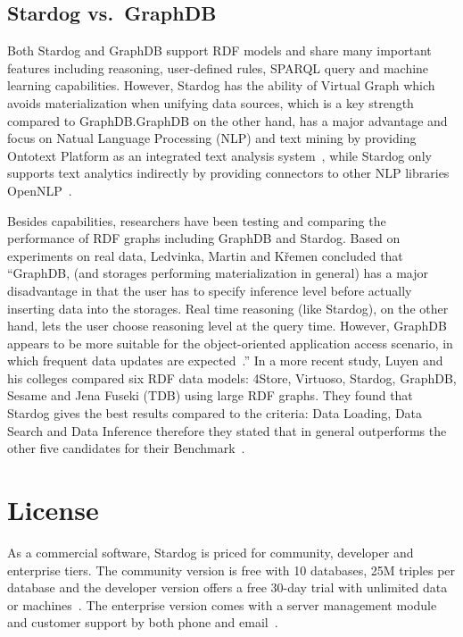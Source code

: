 \subsection{Stardog vs.\ GraphDB}
Both Stardog and GraphDB support RDF models and share many important 
features including reasoning, user-defined rules, SPARQL query and machine 
learning capabilities. However, Stardog has the ability of Virtual Graph which 
avoids materialization when unifying data sources, which is a key strength 
compared to GraphDB.\@ GraphDB on the other hand, has a major advantage 
and focus on Natual Language Processing (NLP) and text mining by 
providing Ontotext Platform as an integrated text analysis 
system~\cite{hid-sp18-405-www-stardog-ontotext}, while Stardog only 
supports text analytics indirectly by providing connectors to other NLP 
libraries OpenNLP~\cite{hid-sp18-405-www-stardog-docs}. 

Besides capabilities, researchers have been testing and comparing the 
performance of RDF graphs including GraphDB and Stardog. Based on 
experiments on real data, Ledvinka, Martin and K{\v{r}}emen concluded that 
``GraphDB, (and storages performing materialization in general) has a major 
disadvantage in that the user has to specify inference level before actually 
inserting data into the storages. Real time reasoning (like Stardog), on the 
other hand, lets the user choose reasoning level at the query time. However, 
GraphDB appears to be more suitable for the object-oriented application 
access scenario, in which frequent data updates are 
expected~\cite{hid-sp18-405-ledvinka2015object-stardog}.'' In a more recent 
study, Luyen and his colleges compared six RDF data models: 4Store, 
Virtuoso, Stardog, GraphDB, Sesame and Jena Fuseki (TDB) using large RDF 
graphs. They found that Stardog gives the best results compared to the 
criteria: Data Loading, Data Search and Data Inference therefore they stated 
that in general outperforms the other five candidates for their 
Benchmark~\cite{hid-sp18-405-luyen2016development-stardog}.


\section{License}
As a commercial software, Stardog is priced for community, developer and 
enterprise tiers. The community version is free with 10 databases, 25M triples 
per database and the developer version offers a free 30-day trial with 
unlimited data or 
machines~\cite{hid-sp18-405-www-stardog-predictiveanalyticstoday}. The 
enterprise version comes with a server management module and customer 
support by both phone and email~\cite{hid-sp18-405-www-stardog-docs}.


